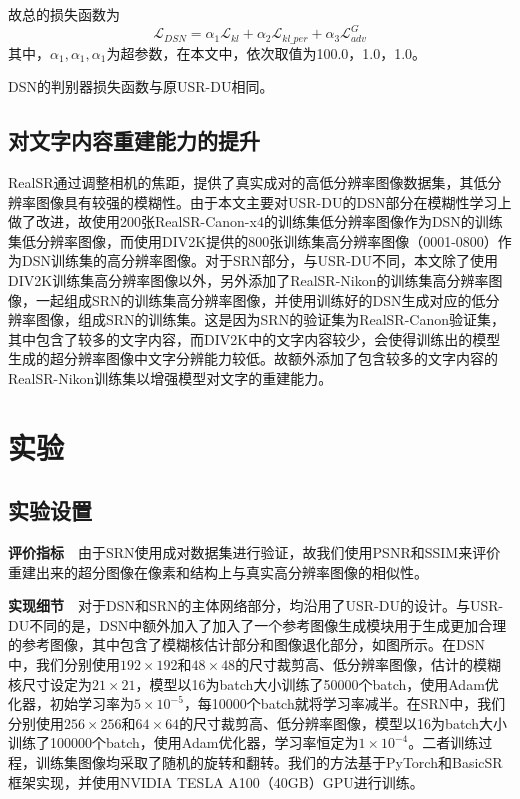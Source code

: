 故总的损失函数为
\begin{equation}
    \mathcal{L}_{DSN} = \alpha_1\mathcal{L}_{kl}+\alpha_2\mathcal{L}_{kl\_per}+\alpha_3\mathcal{L}_{adv}^G
\end{equation}
其中，$\alpha_1,\alpha_1,\alpha_1$为超参数，在本文中，依次取值为100.0，1.0，1.0。

DSN的判别器损失函数与原USR-DU相同。

\subsection{对文字内容重建能力的提升}
RealSR通过调整相机的焦距，提供了真实成对的高低分辨率图像数据集，其低分辨率图像具有较强的模糊性。由于本文主要对USR-DU的DSN部分在模糊性学习上做了改进，故使用200张RealSR-Canon-x4的训练集低分辨率图像作为DSN的训练集低分辨率图像，而使用DIV2K提供的800张训练集高分辨率图像（0001-0800）作为DSN训练集的高分辨率图像。对于SRN部分，与USR-DU不同，本文除了使用DIV2K训练集高分辨率图像以外，另外添加了RealSR-Nikon的训练集高分辨率图像，一起组成SRN的训练集高分辨率图像，并使用训练好的DSN生成对应的低分辨率图像，组成SRN的训练集。这是因为SRN的验证集为RealSR-Canon验证集，其中包含了较多的文字内容，而DIV2K中的文字内容较少，会使得训练出的模型生成的超分辨率图像中文字分辨能力较低。故额外添加了包含较多的文字内容的RealSR-Nikon训练集以增强模型对文字的重建能力。
\section{实验}
\subsection{实验设置}
\noindent\textbf{评价指标}\ \ 由于SRN使用成对数据集进行验证，故我们使用PSNR和SSIM来评价重建出来的超分图像在像素和结构上与真实高分辨率图像的相似性。

\noindent\textbf{实现细节}\ \ 对于DSN和SRN的主体网络部分，均沿用了USR-DU的设计。与USR-DU不同的是，DSN中额外加入了加入了一个参考图像生成模块用于生成更加合理的参考图像，其中包含了模糊核估计部分和图像退化部分，如图所示。在DSN中，我们分别使用$192\times192$和$48\times48$的尺寸裁剪高、低分辨率图像，估计的模糊核尺寸设定为$21\times21$，模型以16为batch大小训练了50000个batch，使用Adam优化器，初始学习率为$5\times10^{-5}$，每10000个batch就将学习率减半。在SRN中，我们分别使用$256\times256$和$64\times64$的尺寸裁剪高、低分辨率图像，模型以16为batch大小训练了100000个batch，使用Adam优化器，学习率恒定为$1\times10^{-4}$。二者训练过程，训练集图像均采取了随机的旋转和翻转。我们的方法基于PyTorch和BasicSR\parencite{basicsr}框架实现，并使用NVIDIA TESLA A100（40GB）GPU进行训练。
